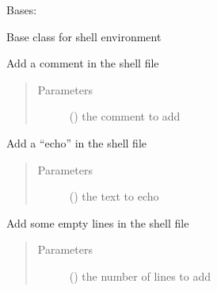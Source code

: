\documentclass[a4paper,10pt,english]{sphinxmanual}
\begin{document}

\begin{fulllineitems}
\label{\detokenize{commands/apidoc/src:src.fileEnviron.FileEnviron}}
Bases: 

Base class for shell environment

\begin{fulllineitems}
\label{\detokenize{commands/apidoc/src:src.fileEnviron.FileEnviron.add_comment}}
Add a comment in the shell file
\begin{quote}\begin{description}
\item[{Parameters}] \leavevmode
{} () \textendash{} the comment to add

\end{description}\end{quote}

\end{fulllineitems}


\begin{fulllineitems}
\label{\detokenize{commands/apidoc/src:src.fileEnviron.FileEnviron.add_echo}}
Add a “echo” in the shell file
\begin{quote}\begin{description}
\item[{Parameters}] \leavevmode
{} () \textendash{} the text to echo

\end{description}\end{quote}

\end{fulllineitems}


\begin{fulllineitems}
\label{\detokenize{commands/apidoc/src:src.fileEnviron.FileEnviron.add_line}}
Add some empty lines in the shell file
\begin{quote}\begin{description}
\item[{Parameters}] \leavevmode
{} () \textendash{} the number of lines to add


\end{description}
\end{quote}
\end{fulllineitems}
\end{fulllineitems}
\end{document}
